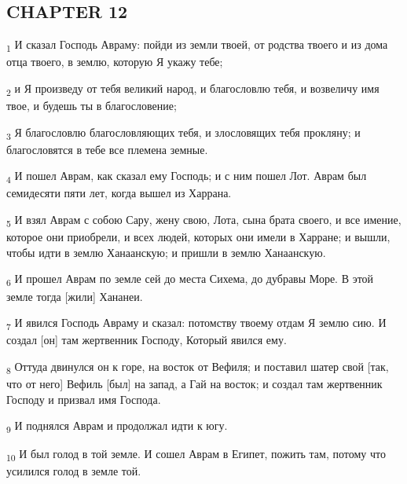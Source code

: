 \subsection{CHAPTER 12}
\begin{tcolorbox}
\textsubscript{1} И сказал Господь Авраму: пойди из земли твоей, от родства твоего и из дома отца твоего, в землю, которую Я укажу тебе;
\end{tcolorbox}
\begin{tcolorbox}
\textsubscript{2} и Я произведу от тебя великий народ, и благословлю тебя, и возвеличу имя твое, и будешь ты в благословение;
\end{tcolorbox}
\begin{tcolorbox}
\textsubscript{3} Я благословлю благословляющих тебя, и злословящих тебя прокляну; и благословятся в тебе все племена земные.
\end{tcolorbox}
\begin{tcolorbox}
\textsubscript{4} И пошел Аврам, как сказал ему Господь; и с ним пошел Лот. Аврам был семидесяти пяти лет, когда вышел из Харрана.
\end{tcolorbox}
\begin{tcolorbox}
\textsubscript{5} И взял Аврам с собою Сару, жену свою, Лота, сына брата своего, и все имение, которое они приобрели, и всех людей, которых они имели в Харране; и вышли, чтобы идти в землю Ханаанскую; и пришли в землю Ханаанскую.
\end{tcolorbox}
\begin{tcolorbox}
\textsubscript{6} И прошел Аврам по земле сей до места Сихема, до дубравы Море. В этой земле тогда [жили] Хананеи.
\end{tcolorbox}
\begin{tcolorbox}
\textsubscript{7} И явился Господь Авраму и сказал: потомству твоему отдам Я землю сию. И создал [он] там жертвенник Господу, Который явился ему.
\end{tcolorbox}
\begin{tcolorbox}
\textsubscript{8} Оттуда двинулся он к горе, на восток от Вефиля; и поставил шатер свой [так, что от него] Вефиль [был] на запад, а Гай на восток; и создал там жертвенник Господу и призвал имя Господа.
\end{tcolorbox}
\begin{tcolorbox}
\textsubscript{9} И поднялся Аврам и продолжал идти к югу.
\end{tcolorbox}
\begin{tcolorbox}
\textsubscript{10} И был голод в той земле. И сошел Аврам в Египет, пожить там, потому что усилился голод в земле той.
\end{tcolorbox}
